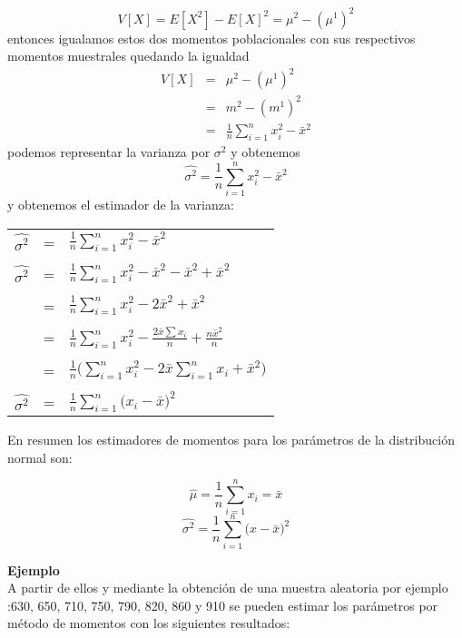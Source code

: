 \documentclass[base=hide,11pt]{elegantbook}
\begin{document}
{			$$V[X]=E[X^{2}]-E[X]^{2} = \mu^{2}-(\mu^{1})^{2}$$
			entonces igualamos estos dos momentos poblacionales con sus respectivos momentos muestrales quedando la igualdad
			\begin{eqnarray*}
				V[X]&=& \mu^{2}-(\mu^{1})^{2}\\
				&=&m^{2}-(m^{1})^{2}\\
				&=&\displaystyle\frac{1}{n}\sum_{i=1}^{n}x_{i}^{2}-\bar{x}^{2}
			\end{eqnarray*}
podemos representar la varianza por $\sigma^{2}$ y obtenemos
$$\widehat{\sigma^{2}}=\displaystyle\frac{1}{n}\sum_{i=1}^{n}x_{i}^{2}-\bar{x}^{2}$$
y obtenemos el estimador de la varianza:
\begin{center}
\begin{tabular}{cll}
$\widehat{\sigma^{2}}$&=&$\displaystyle\frac{1}{n}\sum_{i=1}^{n}x_{i}^{2}-\bar{x}^{2}$\\
&&\\
$\widehat{\sigma^{2}}$&=&$\displaystyle\frac{1}{n}\sum_{i=1}^{n}x_{i}^{2}-\bar{x}^{2}-\bar{x}^{2}+\bar{x}^{2}$\\
&&\\
&=& $\displaystyle\frac{1}{n}\sum_{i=1}^{n}x_{i}^{2}-2\bar{x}^{2}+\bar{x}^{2}$\\
&&\\
&=& $\displaystyle\frac{1}{n}\sum_{i=1}^{n}x_{i}^{2}-\displaystyle\frac{2\bar{x}\sum x_{i}}{n}+\displaystyle\frac{n \bar{x}^{2}}{n}$\\
&&\\
&=& $\displaystyle\frac{1}{n}\Big(\sum_{i=1}^{n} x_{i}^{2}-2\bar{x}\sum_{i=1}^{n} x_{i}+\bar{x}^{2}\Big)$\\
&&\\
$\widehat{\sigma^{2}}$&=&$\displaystyle\frac{1}{n}\sum_{i=1}^{n}\Big(x_i-\bar{x}\Big)^{2}$\\
\end{tabular}
\end{center}
En resumen los estimadores de momentos para los parámetros de la distribución normal son:
			
$$\widehat{\mu} = \displaystyle\frac{1}{n}\sum_{i=1}^{n} x_{i}=\bar{x} $$ 
$$\widehat{\sigma^{2}}=\displaystyle\frac{1}{n}\sum_{i=1}^{n}\Big(x-\bar{x}\Big)^{2}$$


\textcolor{col3}{\bf \large Ejemplo}\\			
A partir de ellos y mediante la obtención de una muestra aleatoria por ejemplo :630, 650, 710, 750, 790, 820, 860 y 910 se pueden estimar los parámetros por método de momentos con los siguientes resultados:
			
}
\end{document}
